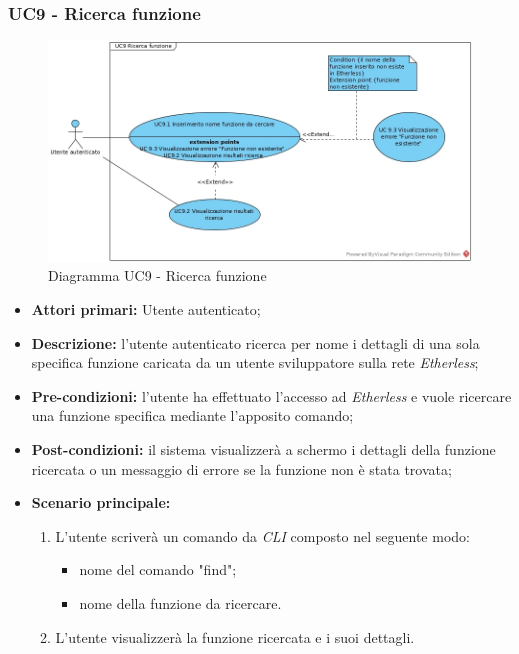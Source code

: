 \subsubsection{UC9 - Ricerca funzione}
\begin{figure}[h]
	\centering
	\includegraphics[width=\linewidth]{res/img/UC9.jpg}
	\caption{Diagramma UC9 - Ricerca funzione}
\end{figure}
\begin{itemize}
	\item \textbf{Attori primari:} Utente autenticato;
	\item \textbf{Descrizione:} l'utente autenticato ricerca per nome i dettagli di una sola specifica funzione caricata da un utente sviluppatore sulla rete \textit{Etherless};
	\item \textbf{Pre-condizioni:} l'utente ha effettuato l'accesso ad \textit{Etherless} e vuole ricercare una funzione specifica mediante l'apposito comando;
	\item \textbf{Post-condizioni:} il sistema visualizzerà a schermo i dettagli della funzione ricercata o un messaggio di errore se la funzione non è stata trovata;
	\item \textbf{Scenario principale:}
	\begin{enumerate}
		\item L'utente scriverà un comando da \textit{CLI\glos} composto nel seguente modo:
		\begin{itemize}
			\item nome del comando "find";
			\item nome della funzione da ricercare.
		\end{itemize}
        \item L'utente visualizzerà la funzione ricercata e i suoi dettagli.
	\end{enumerate}
\end{itemize}
